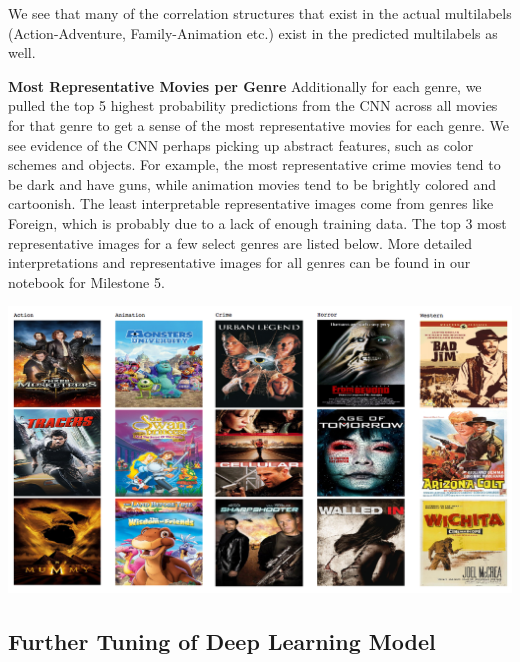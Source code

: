 \documentclass{article}
\begin{document}
        We see that many of the correlation structures that exist in the actual multilabels (Action-Adventure, Family-Animation etc.) exist in the predicted multilabels as well.
        
        \textbf{Most Representative Movies per Genre}
        Additionally for each genre, we pulled the top 5 highest probability predictions from the CNN across all movies for that genre to get a sense of the most representative movies for each genre. We see evidence of the CNN perhaps picking up abstract features, such as color schemes and objects. For example, the most representative crime movies tend to be dark and have guns, while animation movies tend to be brightly colored and cartoonish. The least interpretable representative images come from genres like Foreign, which is probably due to a lack of enough training data. The top 3 most representative images for a few select genres are listed below. More detailed interpretations and representative images for all genres can be found in our notebook for Milestone 5. 
        
        \begin{center}
            \includegraphics[width=16cm]{mostrepresentative}
        \end{center}
        

        
    \subsection{Further Tuning of Deep Learning Model}
    \indent 
    
\end{document}
